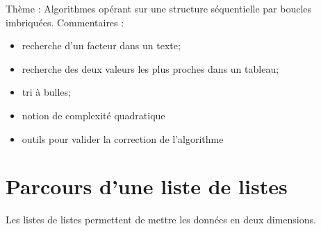 \documentclass[t,10pt]{article}
\begin{document}
\enteteinfo


\bigskip

Thème : Algorithmes opérant sur une structure séquentielle par boucles imbriquées. 
Commentaires :
\begin{itemize}
\item recherche d'un facteur dans un texte;
\item recherche des deux valeurs les plus proches dans un tableau;
\item tri à bulles;
\item notion de complexité quadratique
\item outils pour valider la correction de l'algorithme
\end{itemize}


\section{Parcours d'une liste de listes}
Les listes de listes permettent de mettre les données en deux dimensions. 
\end{document}

